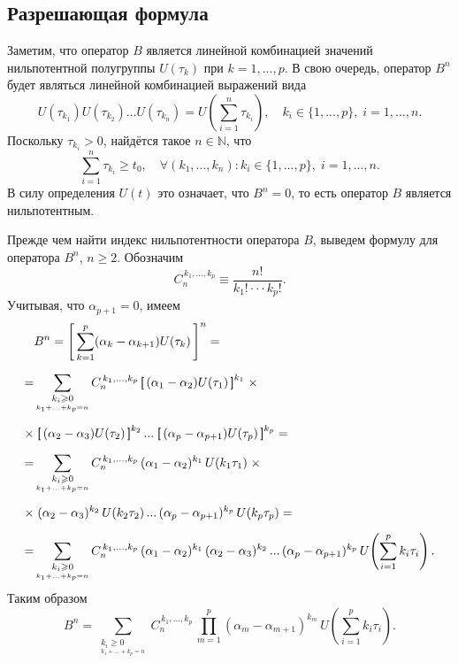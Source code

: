 \documentclass{article}
\renewcommand{\ge}{\geqslant}
\newcommand{\h}{\textsf}
\theoremstyle{definition}
\begin{document}
\subsection{Разрешающая формула}
Заметим, что оператор $B$ является линейной комбинацией значений нильпотентной полугруппы $U(\tau_k)$ при $k = 1, ..., p$.
В свою очередь, оператор $B^n$ будет являться линейной комбинацией выражений вида
\begin{equation*}
	U(\tau_{k_1})U(\tau_{k_2})...U(\tau_{k_n\!}) = U\!\left( \sum_{i = 1}^{n}\tau_{k_i} \right), 
	\quad k_i \in \{1,...,p\}, \; i = 1,...,n.
\end{equation*}
Поскольку $\tau_{k_i} > 0$, найдётся такое $n \in \mathbb{N}$, что 
\begin{equation*}
	\sum_{i = 1}^{n}\tau_{k_i} \ge t_0, \quad \forall (k_1,...,k_n) : k_i \in \{1,...,p\}, \; i = 1,...,n.
\end{equation*}
В силу определения $U(t)$ это означает, что $B^n = 0$, то есть оператор $B$ является нильпотентным. 

Прежде чем найти индекс нильпотентности оператора $B$, выведем формулу для оператора $B^n$, $n \ge 2$. 
Обозначим
\begin{equation*}
	C_n^{\,k_1, ..., k_p} \equiv \frac{n!}{k_1! \cdot\cdot\cdot k_p!}.
\end{equation*}
Учитывая, что $\alpha_{p + 1} = 0$, имеем
\begin{equation*}
\begin{aligned}
	  & B^n = \left[\, \sum\limits_{k = 1}^{p} (\alpha_k - \alpha_{k + 1})U(\tau_k) \,\right]^n = \\[2mm]
	= & \sum\limits_{\substack{{k_i \ge 0} \\_{k_1 + ... + k_p = n}}} C_n^{\,k_1, ..., k_p}\,
	 \h[\, (\alpha_1 - \alpha_2)U(\tau_1) \, \h]^{k_1}\; \times \\[2mm] 
\times & \;\h[\, (\alpha_2 - \alpha_3)U(\tau_2) \, \h]^{k_2}\, ... \;\h[\, (\alpha_p - \alpha_{p + 1})U(\tau_p) \, \h]^{k_p} = \\[2mm]
	= & \sum\limits_{\substack{{k_i \ge 0} \\_{k_1 + ... + k_p = n}}} C_n^{\,k_1, ..., k_p}\,
	(\alpha_1 - \alpha_2)^{k_1}\,U(k_1\tau_1)\; \times \\[2mm]
\times & \;(\alpha_2 - \alpha_3)^{k_2}\,U(k_2\tau_2)\, ... \,(\alpha_p - \alpha_{p + 1})^{k_p}\,U(k_p\tau_p) = \\[2mm]
	= & \sum\limits_{\substack{{k_i \ge 0} \\_{k_1 + ... + k_p = n}}} C_n^{\,k_1, ..., k_p}\, (\alpha_1 - \alpha_2)^{k_1}\,
	(\alpha_2 - \alpha_3)^{k_2}\, ... \,(\alpha_p - \alpha_{p + 1})^{k_p}\,U\!\left( \sum\limits_{i = 1}^{p}k_i\tau_i \right).
\end{aligned}
\end{equation*}
Таким образом 
\begin{equation} \label{B^n}
	B^n = \sum\limits_{\substack{{k_i \ge 0} \\_{k_1 + ... + k_p = n}}} C_n^{\,k_1, ..., k_p}\,
	\prod_{m = 1}^{p}(\alpha_m - \alpha_{m + 1})^{k_m}\,U\!\left( \sum\limits_{i = 1}^{p}k_i\tau_i \right).
\end{equation}
\end{document}
